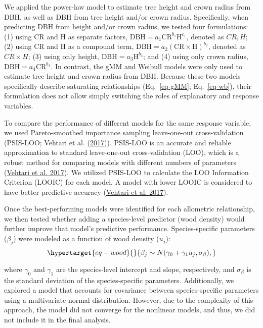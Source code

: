 \documentclass[
  12pt,
  letterpaper,
  DIV=11,
  numbers=noendperiod]{scrartcl}
\begin{document}
We applied the power-law model to estimate tree height and crown radius
from DBH, as well as DBH from tree height and/or crown radius.
Specifically, when predicting DBH from height and/or crown radius, we
tested four formulations: (1) using CR and H as separate factors,
\(\mathrm{DBH} = a_1 \mathrm{CR}^{b_1} \mathrm{H}^{c_1}\), denoted as
\(CR,H\); (2) using CR and H as a compound term,
\(\mathrm{DBH} = a_2 (\mathrm{CR} \times \mathrm{H})^{b_2}\), denoted as
\(CR \times H\); (3) using only height,
\(\mathrm{DBH} = a_3 \mathrm{H}^{b_3}\); and (4) using only crown
radius, \(\mathrm{DBH} = a_4 \mathrm{CR}^{b_4}\). In contrast, the gMM
and Weibull models were only used to estimate tree height and crown
radius from DBH. Because these two models specifically describe
saturating relationships (Eq.~\ref{eq-gMM}; Eq.~\ref{eq-wb}), their
formulation does not allow simply switching the roles of explanatory and
response variables.

To compare the performance of different models for the same response
variable, we used Pareto-smoothed importance sampling leave-one-out
cross-validation (PSIS-LOO; Vehtari et al.
(\protect\hyperlink{ref-Vehtari2017}{2017})). PSIS-LOO is an accurate
and reliable approximation to standard leave-one-out cross-validation
(LOO), which is a robust method for comparing models with different
numbers of parameters (\protect\hyperlink{ref-Vehtari2017}{Vehtari et
al. 2017}). We utilized PSIS-LOO to calculate the LOO Information
Criterion (LOOIC) for each model. A model with lower LOOIC is considered
to have better predictive accuracy
(\protect\hyperlink{ref-Vehtari2017}{Vehtari et al. 2017}).

Once the best-performing models were identified for each allometric
relationship, we then tested whether adding a species-level predictor
(wood density) would further improve that model's predictive
performance. Species-specific parameters (\(\beta_j\)) were modeled as a
function of wood density (\(u_j\)):
\begin{equation}\protect\hypertarget{eq-wood}{}{
\beta_{j} \sim N(\gamma_{0} + \gamma_{1} u_j, \sigma_{\beta}),
}\label{eq-wood}\end{equation}

where \(\gamma_{0}\) and \(\gamma_{1}\) are the species-level intercept
and slope, respectively, and \(\sigma_{\beta}\) is the standard
deviation of the species-specific parameters. Additionally, we explored
a model that accounts for covariance between species-specific parameters
using a multivariate normal distribution. However, due to the complexity
of this approach, the model did not converge for the nonlinear models,
and thus, we did not include it in the final analysis.
\end{document}
